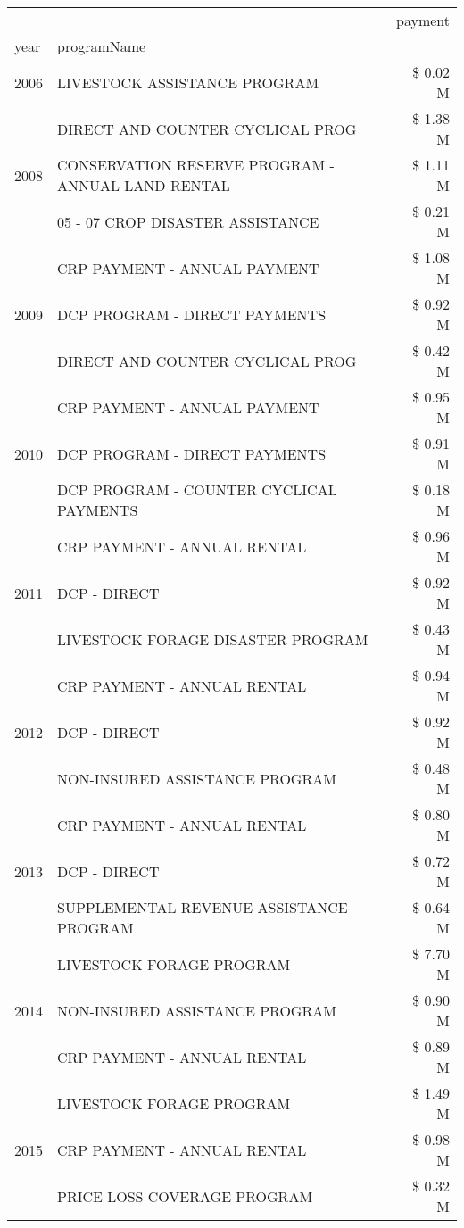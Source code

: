 \begin{tabular}{llr}
\toprule
 &  & payment \\
year & programName &  \\
\midrule
2006 & LIVESTOCK ASSISTANCE PROGRAM & \$ 0.02 M \\
\cline{1-3}
\multirow[t]{3}{*}{2008} & DIRECT AND COUNTER CYCLICAL PROG & \$ 1.38 M \\
 & CONSERVATION RESERVE PROGRAM - ANNUAL LAND RENTAL & \$ 1.11 M \\
 & 05 - 07 CROP DISASTER ASSISTANCE & \$ 0.21 M \\
\cline{1-3}
\multirow[t]{3}{*}{2009} & CRP PAYMENT - ANNUAL PAYMENT & \$ 1.08 M \\
 & DCP PROGRAM - DIRECT PAYMENTS & \$ 0.92 M \\
 & DIRECT AND COUNTER CYCLICAL PROG & \$ 0.42 M \\
\cline{1-3}
\multirow[t]{3}{*}{2010} & CRP PAYMENT - ANNUAL PAYMENT & \$ 0.95 M \\
 & DCP PROGRAM - DIRECT PAYMENTS & \$ 0.91 M \\
 & DCP PROGRAM - COUNTER CYCLICAL PAYMENTS & \$ 0.18 M \\
\cline{1-3}
\multirow[t]{3}{*}{2011} & CRP PAYMENT - ANNUAL RENTAL & \$ 0.96 M \\
 & DCP - DIRECT & \$ 0.92 M \\
 & LIVESTOCK FORAGE DISASTER PROGRAM & \$ 0.43 M \\
\cline{1-3}
\multirow[t]{3}{*}{2012} & CRP PAYMENT - ANNUAL RENTAL & \$ 0.94 M \\
 & DCP - DIRECT & \$ 0.92 M \\
 & NON-INSURED ASSISTANCE PROGRAM & \$ 0.48 M \\
\cline{1-3}
\multirow[t]{3}{*}{2013} & CRP PAYMENT - ANNUAL RENTAL & \$ 0.80 M \\
 & DCP - DIRECT & \$ 0.72 M \\
 & SUPPLEMENTAL REVENUE ASSISTANCE PROGRAM & \$ 0.64 M \\
\cline{1-3}
\multirow[t]{3}{*}{2014} & LIVESTOCK FORAGE PROGRAM & \$ 7.70 M \\
 & NON-INSURED ASSISTANCE PROGRAM & \$ 0.90 M \\
 & CRP PAYMENT - ANNUAL RENTAL & \$ 0.89 M \\
\cline{1-3}
\multirow[t]{3}{*}{2015} & LIVESTOCK FORAGE PROGRAM & \$ 1.49 M \\
 & CRP PAYMENT - ANNUAL RENTAL & \$ 0.98 M \\
 & PRICE LOSS COVERAGE PROGRAM & \$ 0.32 M \\

\end{tabular}
